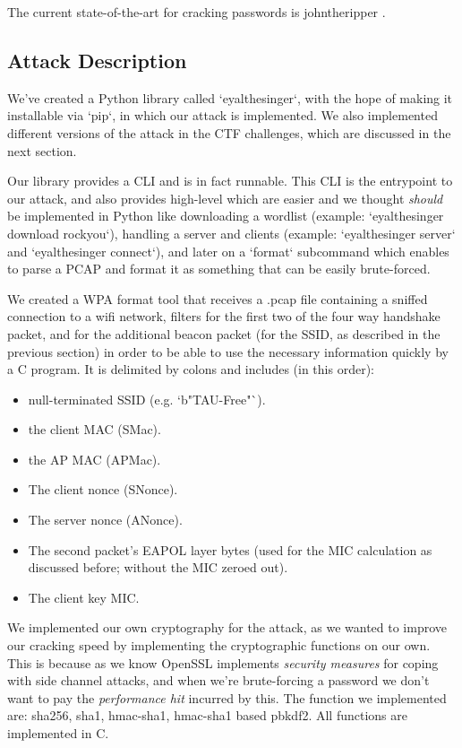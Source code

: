 \documentclass[sigconf]{acmart}
\begin{document}
The current state-of-the-art for cracking passwords is johntheripper \cite{john}.

\subsection{Attack Description}

We've created a Python library called `eyalthesinger`, with the hope of making it installable via `pip`, in which our attack is implemented. We also implemented different versions of the attack in the CTF challenges, which are discussed in the next section.

Our library provides a CLI and is in fact runnable. This CLI is the entrypoint to our attack, and also provides high-level which are easier and we thought \textit{should} be implemented in Python like downloading a wordlist (example: `eyalthesinger download rockyou`), handling a server and clients (example: `eyalthesinger server` and `eyalthesinger connect`), and later on a `format` subcommand which enables to parse a PCAP and format it as something that can be easily brute-forced.

We created a WPA format tool that receives a .pcap file containing a sniffed connection to a wifi network, filters for the first two of the four way handshake packet, and for the additional beacon packet (for the SSID, as described in the previous section) in order to be able to use the necessary information quickly by a C program. It is delimited by colons and includes (in this order):
\begin{itemize}
\item null-terminated SSID (e.g. `b"TAU-Free"`).
\item the client MAC (SMac).
\item the AP MAC (APMac).
\item The client nonce (SNonce).
\item The server nonce (ANonce).
\item The second packet's EAPOL layer bytes (used for the MIC calculation as discussed before; without the MIC zeroed out).
\item The client key MIC.
\end{itemize}

We implemented our own cryptography for the attack, as we wanted to improve our cracking speed by implementing the cryptographic functions on our own. This is because as we know OpenSSL implements \textit{security measures} for coping with side channel attacks, and when we're brute-forcing a password we don't want to pay the \textit{performance hit} incurred by this. The function we implemented are: sha256, sha1, hmac-sha1, hmac-sha1 based pbkdf2. All functions are implemented in C.
\end{document}
